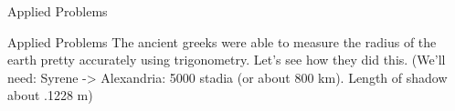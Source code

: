 \documentclass[presentation]{beamer}
\begin{document}
\begin{frame}[label={sec:orga467375}]{Applied Problems}
\end{frame}

\begin{frame}[label={sec:org5aae2bf}]{Applied Problems}
The ancient greeks were able to measure the radius of the earth pretty accurately
using trigonometry.  Let's see how they did this.
(We'll need: Syrene -> Alexandria: 5000 stadia (or about 800 km).  Length of shadow about .1228 m)

\vspace{10in}
\end{frame}
\end{document}
